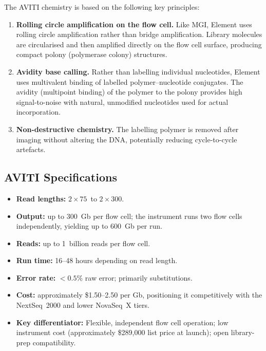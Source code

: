 The AVITI chemistry is based on the following key principles:

\begin{enumerate}[nosep]
  \item \textbf{Rolling circle amplification on the flow cell.} Like MGI, Element uses rolling circle amplification rather than bridge amplification. Library molecules are circularised and then amplified directly on the flow cell surface, producing compact polony (polymerase colony) structures.

  \item \textbf{Avidity base calling.} Rather than labelling individual nucleotides, Element uses multivalent binding of labelled polymer--nucleotide conjugates. The avidity (multipoint binding) of the polymer to the polony provides high signal-to-noise with natural, unmodified nucleotides used for actual incorporation.

  \item \textbf{Non-destructive chemistry.} The labelling polymer is removed after imaging without altering the DNA, potentially reducing cycle-to-cycle artefacts.
\end{enumerate}

\subsection{AVITI Specifications}

\begin{itemize}[nosep]
  \item \textbf{Read lengths:} $2 \times 75$\basepair\ to $2 \times 300$\basepair.
  \item \textbf{Output:} up to 300~Gb per flow cell; the instrument runs two flow cells independently, yielding up to 600~Gb per run.
  \item \textbf{Reads:} up to 1~billion reads per flow cell.
  \item \textbf{Run time:} 16--48 hours depending on read length.
  \item \textbf{Error rate:} $<0.5$\% raw error; primarily substitutions.
  \item \textbf{Cost:} approximately \$1.50--2.50 per Gb, positioning it competitively with the NextSeq~2000 and lower NovaSeq~X tiers.
  \item \textbf{Key differentiator:} Flexible, independent flow cell operation; low instrument cost (approximately \$289{,}000 list price at launch); open library-prep compatibility.
\end{itemize}

